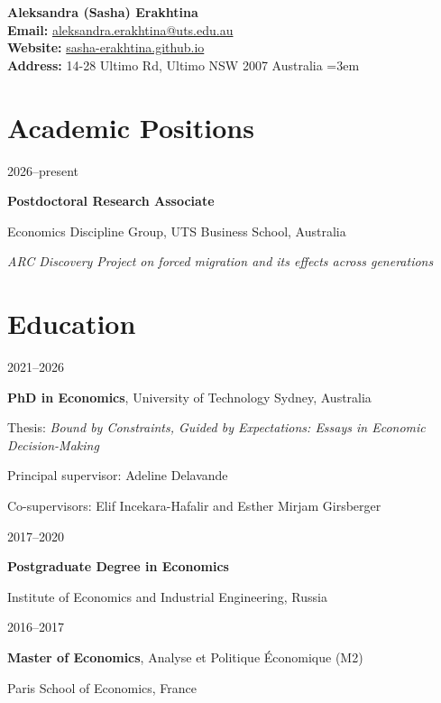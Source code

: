 \documentclass[11pt,a4paper]{article}
\newif\ifphone
\newcommand{\username}{sasha-erakhtina}
\newcommand{\entry}[2]{%
  \begin{minipage}[t]{0.15\textwidth}\raggedright\small #1\end{minipage}%
  \hfill%
  \begin{minipage}[t]{0.83\textwidth}#2\end{minipage}%
  \par\vspace{5pt}}
\newcommand{\oneline}[1]{{\footnotesize\raggedright #1\par}}
\begin{document}

{\large \textbf{Aleksandra (Sasha) Erakhtina}}\\[5pt]
  { \textbf{Email:} \href{mailto:aleksandra.erakhtina@uts.edu.au}{aleksandra.erakhtina@uts.edu.au}}\\
  { \textbf{Website:} \href{https://\username.github.io}{\username.github.io}}%
  \ifphone\\
  {\small \textbf{Mobile:} +61 451 954 050}\fi\\
  { \textbf{Address:} 14-28 Ultimo Rd, Ultimo NSW 2007
Australia
}
\emergencystretch=3em


\section{Academic Positions}

\entry{2026--present}{\textbf{Postdoctoral Research Associate}\par
  Economics Discipline Group, UTS Business School, Australia\par
  {\small \textit{ARC Discovery Project on forced migration and its effects across generations}}}


\section{Education}

\entry{2021--2026}{\textbf{PhD in Economics}, 
  University of Technology Sydney, Australia\par
  \oneline{Thesis: \textit{Bound by Constraints, Guided by Expectations: Essays in Economic Decision-Making}}\par
  { Principal supervisor: Adeline Delavande}\par
  { Co-supervisors: Elif Incekara-Hafalir and Esther Mirjam Girsberger}}

\entry{2017--2020}{\textbf{Postgraduate Degree in Economics}\par
  Institute of Economics and Industrial Engineering, Russia}

\entry{2016--2017}{\textbf{Master of Economics}, Analyse et Politique Économique (M2) \par
  Paris School of Economics, France}
\end{document}
